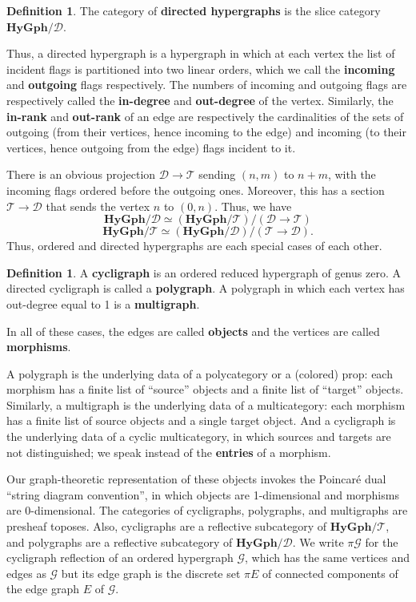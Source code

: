 \documentclass{article}
\theoremstyle{definition}
\newtheorem{defn}[thm]{Definition}
\theoremstyle{remark}
\def\G{\mathcal{G}}
\def\hy{\mathbf{HyGph}}
\def\thy{\mathcal{T}}
\def\dhy{\mathcal{D}}
\begin{document}
\begin{defn}
  The category of \textbf{directed hypergraphs} is the slice category $\hy/\dhy$.
\end{defn}

Thus, a directed hypergraph is a hypergraph in which at each vertex the list of incident flags is partitioned into two linear orders, which we call the \textbf{incoming} and \textbf{outgoing} flags respectively.
The numbers of incoming and outgoing flags are respectively called the \textbf{in-degree} and \textbf{out-degree} of the vertex.
Similarly, the \textbf{in-rank} and \textbf{out-rank} of an edge are respectively the cardinalities of the sets of outgoing (from their vertices, hence incoming to the edge) and incoming (to their vertices, hence outgoing from the edge) flags incident to it.

There is an obvious projection $\dhy\to\thy$ sending $(n,m)$ to $n+m$, with the incoming flags ordered before the outgoing ones.
Moreover, this has a section $\thy\to\dhy$ that sends the vertex $n$ to $(0,n)$.
Thus, we have
\[\hy/\dhy \simeq (\hy/\thy)/(\dhy\to\thy) \]
\[\hy/\thy \simeq (\hy/\dhy)/(\thy\to\dhy).\]
Thus, ordered and directed hypergraphs are each special cases of each other.

\begin{defn}
  A \textbf{cycligraph} is an ordered reduced hypergraph of genus zero.
  A directed cycligraph is called a \textbf{polygraph}.
  A polygraph in which each vertex has out-degree equal to 1 is a \textbf{multigraph}.

  In all of these cases, the edges are called \textbf{objects} and the vertices are called \textbf{morphisms}.
\end{defn}

A polygraph is the underlying data of a polycategory or a (colored) prop: each morphism has a finite list of ``source'' objects and a finite list of ``target'' objects.
Similarly, a multigraph is the underlying data of a multicategory: each morphism has a finite list of source objects and a single target object.
And a cycligraph is the underlying data of a cyclic multicategory, in which sources and targets are not distinguished; we speak instead of the \textbf{entries} of a morphism.

Our graph-theoretic representation of these objects invokes the Poincar\'e dual ``string diagram convention'', in which objects are 1-dimensional and morphisms are 0-dimensional.
The categories of cycligraphs, polygraphs, and multigraphs are presheaf toposes.
Also, cycligraphs are a reflective subcategory of $\hy/\thy$, and polygraphs are a reflective subcategory of $\hy/\dhy$.
We write $\pi \G$ for the cycligraph reflection of an ordered hypergraph $\G$, which has the same vertices and edges as $\G$ but its edge graph is the discrete set $\pi E$ of connected components of the edge graph $E$ of $\G$.
\end{document}
